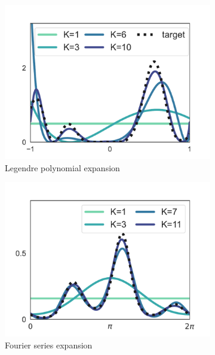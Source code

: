 \begin{figure}[t]
\centering
\begin{subfigure}[b]{0.325\linewidth}
    \centering
    \includegraphics[scale=0.31]{figs/1d_legendre2.pdf}
    \caption{Legendre polynomial expansion}
\end{subfigure}
\begin{subfigure}[b]{0.325\linewidth}
    \centering
    \includegraphics[scale=0.31]{figs/1d_fourier2.pdf}
    \caption{Fourier series expansion}
\end{subfigure}
\begin{subfigure}[b]{0.325\linewidth}
    \centering

\end{subfigure}
\end{figure}
